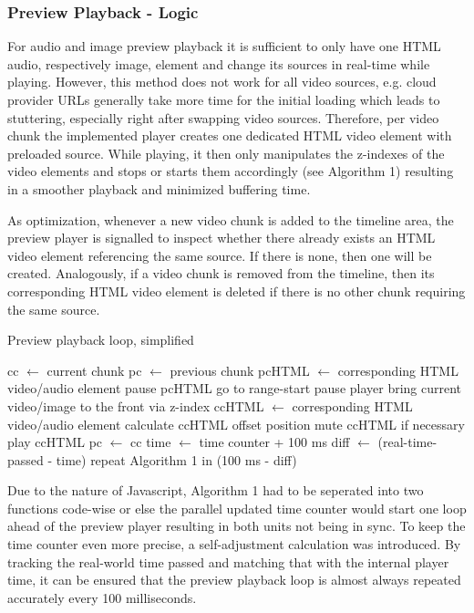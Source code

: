 \documentclass[conference]{IEEEtran}
\begin{document}
\subsubsection{Preview Playback - Logic}
For audio and image preview playback it is sufficient to only have one HTML audio, respectively image, element and change its sources in real-time while playing.
However, this method does not work for all video sources, e.g. cloud provider URLs generally take more time for the initial loading which leads to stuttering, especially right after swapping video sources.
Therefore, per video chunk the implemented player creates one dedicated HTML video element with preloaded source.
While playing, it then only manipulates the z-indexes of the video elements and stops or starts them accordingly (see Algorithm 1) resulting in a smoother playback and minimized buffering time.

As optimization, whenever a new video chunk is added to the timeline area, the preview player is signalled to inspect whether there already exists an HTML video element referencing the same source.
If there is none, then one will be created.
Analogously, if a video chunk is removed from the timeline, then its corresponding HTML video element is deleted if there is no other chunk requiring the same source.
\begin{algorithm}[H]
\caption{Preview playback loop, simplified}
	\begin{algorithmic}[1]
		\STATE cc $\gets$ current chunk
		\STATE pc $\gets$ previous chunk
		\STATE pcHTML $\gets$ corresponding HTML video/audio element
		\STATE pause pcHTML
		\ENDIF
		\STATE go to range-start
		\ELSE
		\STATE pause player
		\RETURN
		\ENDIF
		\ENDIF
		\STATE bring current video/image to the front via z-index
		\STATE ccHTML $\gets$ corresponding HTML video/audio element
		\STATE calculate ccHTML offset position
		\STATE mute ccHTML if necessary
		\STATE play ccHTML
		\ENDIF
		\STATE pc $\gets$ cc
		\STATE time $\gets$ time counter + 100 ms
		\STATE diff $\gets$ (real-time-passed - time)
		\STATE repeat Algorithm 1 in (100 ms - diff)
	\end{algorithmic}
\end{algorithm}
Due to the nature of Javascript, Algorithm 1 had to be seperated into two functions code-wise or else the parallel updated time counter would start one loop ahead of the preview player resulting in both units not being in sync.
To keep the time counter even more precise, a self-adjustment calculation was introduced. By tracking the real-world time passed and matching that with the internal player time, it can be ensured that the preview playback loop is almost always repeated accurately every 100 milliseconds.
\end{document}

